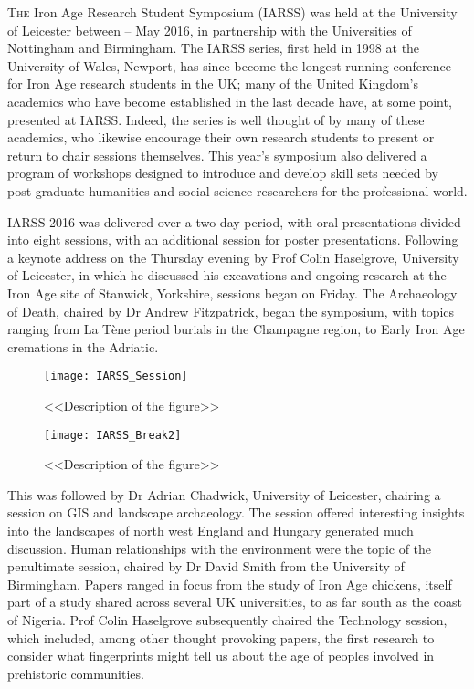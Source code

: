 \documentclass[ngerman,english]{ijsra}
\begin{document}
\IJSRAopening%


\lettrine{T}{he}  Iron Age Research Student Symposium (IARSS) was held at the University of Leicester between  -- May 2016, in partnership with the Universities of Nottingham and Birmingham. 
The IARSS series, first held in 1998 at the University of Wales, Newport, has since become the longest running conference for Iron Age research students in the UK; many of the United Kingdom’s academics who have become established in the last decade have, at some point, presented at IARSS. Indeed, the series is well thought of by many of these academics, who likewise encourage their own research students to present or return to chair sessions themselves. 
This year’s symposium also delivered a program of workshops designed to introduce and develop skill sets needed by post-graduate humanities and social science researchers for the professional world.

IARSS 2016 was delivered over a two day period, with oral presentations divided into eight sessions, with an additional session for poster presentations. Following a keynote address on the Thursday evening by Prof Colin Haselgrove, University of Leicester, in which he discussed his excavations and ongoing research at the Iron Age site of Stanwick, Yorkshire, sessions began on Friday. The Archaeology of Death, chaired by Dr Andrew Fitzpatrick, began the symposium, with topics ranging from La Tène period burials in the Champagne region, to Early Iron Age cremations in the Adriatic. 
\begin{wrapfigure}{O}[.3\textwidth]{0.7\linewidth}
\centering
\texttt{[image: IARSS\_Session]}
\caption{<<Description of the figure>>}
\label{fig:IARSS_Session}
\texttt{[image: IARSS\_Break2]}
\caption{<<Description of the figure>>}
\label{fig:IARSS_Break2}
\end{wrapfigure} 
This was followed by Dr Adrian Chadwick, University of Leicester, chairing a session on GIS and landscape archaeology. The session offered interesting insights into the landscapes of north west England and Hungary generated much discussion. Human relationships with the environment were the topic of the penultimate session, chaired by Dr David Smith from the University of Birmingham. Papers ranged in focus from the study of Iron Age chickens, itself part of a study shared across several UK universities, to as far south as the coast of Nigeria. Prof Colin Haselgrove subsequently chaired the Technology session, which included, among other thought provoking papers, the first research to consider what fingerprints might tell us about the age of peoples involved in prehistoric communities.
\end{document}
